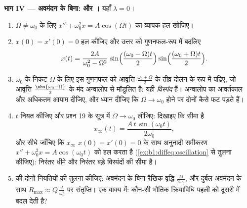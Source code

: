 \begin{problem}
\medskip \noindent\textbf{भाग IV --- अवमंदन के बिना:  और ।}
यहाँ $\lambda = 0$।
\begin{enumerate}[resume]
  \item $\Omega \neq \omega_0$ के लिए $x'' + \omega_0^2 x = A\cos(\Omega t)$
  का व्यापक हल खोजिए।
  \item {} $x(0) = x'(0) = 0$ हल कीजिए और उत्तर को गुणनफल-रूप में
  बदलिए
        \[
        x(t) = \frac{2A}{\omega_0^2 - \Omega^2}\,
        \sin\Bigl(\frac{(\omega_0 - \Omega)t}2\Bigr)
        \sin\Bigl(\frac{(\omega_0 + \Omega)t}2\Bigr) .
        \]
  \item $\omega_0$ के निकट $\Omega$ के लिए इस गुणनफल को आवृत्ति
  $\frac{\omega_0 + \Omega}2$ के तीव्र दोलन के रूप में पढ़िए, जो आवृत्ति
  $\frac{\abs{\omega_0 - \Omega}}2$ के मंद अन्वालोप से मॉडुलित है: यही
  \emph{विस्पंद} हैं। अन्वालोप का आवर्तकाल और अधिकतम आयाम
  दीजिए, और ध्यान दीजिए कि $\Omega \to \omega_0$ होने पर दोनों कैसे फट पड़ते
  हैं।
  \item $t$ नियत कीजिए और प्रश्न 19 के सूत्र में $\Omega \to \omega_0$
  लीजिए: दिखाइए कि सीमा है
        \[
        x_\infty(t) = \frac{A\,t\,\sin(\omega_0 t)}{2\omega_0} ,
        \]
        और सीधे जाँचिए कि $x_\infty$ $x(0) = x'(0) = 0$ के साथ अनुनादी
        समीकरण $x'' + \omega_0^2 x = A\cos(\omega_0 t)$ को हल करता है
        (\cref{ex:b1:diffeq:oscillation} से तुलना कीजिए):  निरंतर धीमे
        और निरंतर बड़े विस्पंदों की सीमा है।
  \item {} की दोनों नियतियों की तुलना कीजिए: अवमंदन के बिना रैखिक वृद्धि
  $\frac{At}{2\omega_0}$, और दुर्बल अवमंदन के साथ $R_{\max} \approx
  Q\,\frac{A}{\omega_0^2}$ पर संतृप्ति। एक वाक्य में: कौन-सी भौतिक
  क्रियाविधि पहली को दूसरी में बदल देती है?
\end{enumerate}


\end{problem}
